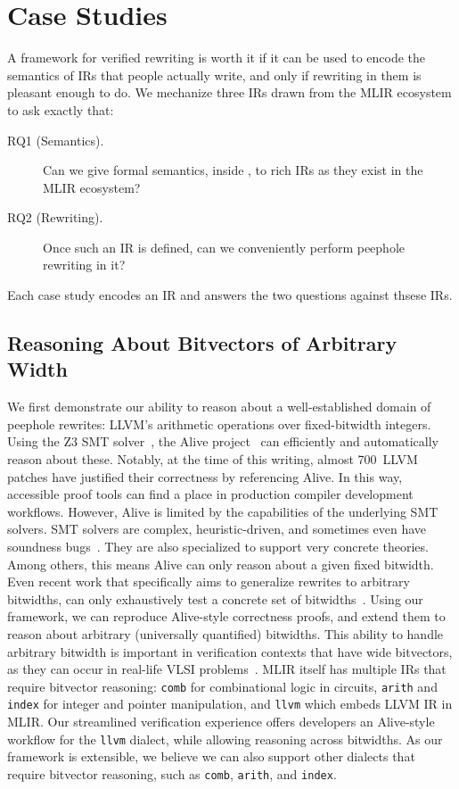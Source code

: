 \section{Case Studies}
\label{sec:mlir:casestudies}

A framework for verified rewriting is worth it if it can be used to encode the semantics of IRs that people actually write,
and only if rewriting in them is pleasant enough to do. We mechanize three IRs drawn from the MLIR ecosystem to
ask exactly that:

\begin{description}
  \item[RQ1 (Semantics).] Can we give formal semantics, inside , to
    rich IRs as they exist in the MLIR ecosystem?
  \item[RQ2 (Rewriting).] Once such an IR is defined, can we conveniently
    perform peephole rewriting in it?
\end{description}

Each case study encodes an IR and answers the two questions against thsese IRs. 

\subsection{Reasoning About Bitvectors of Arbitrary Width}
\label{sec:mlir:bitvectors}

We first demonstrate our ability to reason about a well-established domain of peephole rewrites: LLVM's arithmetic operations over fixed-bitwidth integers.
Using the Z3 SMT solver~\cite{de2008z3}, the Alive project~\cite{lopes2015provably,lopes2021alive2} can efficiently and automatically reason about these.
Notably, at the time of this writing, almost 700~LLVM patches have justified their correctness by referencing Alive.
In this way, accessible proof tools can find a place in production compiler development workflows.
However, Alive is limited by the capabilities of the underlying SMT solvers.
SMT solvers are complex, heuristic-driven, and sometimes even have soundness bugs~\cite{DBLP:conf/pldi/WintererZS20}.
They are also specialized to support very concrete theories.
Among others, this means Alive can only reason about a given fixed bitwidth.
Even recent work that specifically aims to generalize rewrites to arbitrary bitwidths, can only exhaustively test a concrete set of bitwidths~\cite{hydra}.
Using our framework, we can reproduce Alive-style correctness proofs, and extend them to reason about arbitrary (universally quantified) bitwidths.
This ability to handle arbitrary bitwidth is important in verification contexts that have wide bitvectors, as they can occur in real-life VLSI problems~\cite{kallstrom2016fast, wang2013novel}.
MLIR itself has multiple IRs that require bitvector reasoning:
\texttt{comb} for combinational logic in circuits, \texttt{arith} and \texttt{index} for integer and pointer manipulation, and \texttt{llvm} which embeds LLVM IR in MLIR.
Our streamlined verification experience offers developers an Alive-style workflow for the \texttt{llvm} dialect, while allowing reasoning across bitwidths.
As our framework is extensible, we believe we can also support other dialects that require bitvector reasoning, such as \texttt{comb}, \texttt{arith}, and \texttt{index}.

